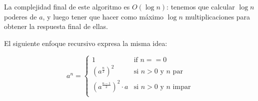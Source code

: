 La complejidad final de este algoritmo es $O(\log n)$: tenemos que calcular $\log n$ poderes de $a$, y luego tener que hacer como máximo $\log n$ multiplicaciones para obtener la respuesta final de ellas.

El siguiente enfoque recursivo expresa la misma idea:

$$a^n = \begin{cases} 1 &\text{if } n == 0 \\ \left(a^{\frac{n}{2}}\right)^2 &\text{si } n > 0 \text{ y } n \text{ par}\\ \left(a^{\frac{n - 1}{2}}\right)^2 \cdot a &\text{si } n > 0 \text { y } n \text{ impar}\\ \end{cases}$$